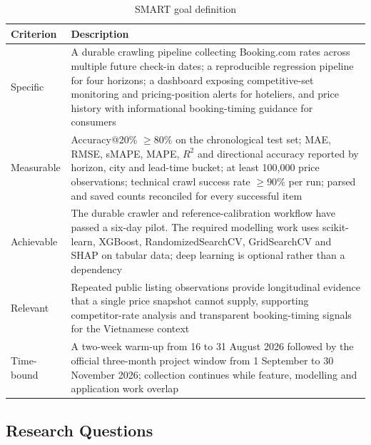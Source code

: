 \begin{table}[!htbp]
\centering
\caption{SMART goal definition}
\label{tab:smart}
\begin{tabular}{|p{2.3cm}|p{11.2cm}|}
\hline
\textbf{Criterion} & \textbf{Description} \\
\hline
Specific & A durable crawling pipeline collecting Booking.com rates across multiple future check-in dates; a reproducible regression pipeline for four horizons; a dashboard exposing competitive-set monitoring and pricing-position alerts for hoteliers, and price history with informational booking-timing guidance for consumers \\
\hline
Measurable & Accuracy@20\% $\geq 80\%$ on the chronological test set; MAE, RMSE, sMAPE, MAPE, $R^2$ and directional accuracy reported by horizon, city and lead-time bucket; at least 100,000 price observations; technical crawl success rate $\geq 90\%$ per run; parsed and saved counts reconciled for every successful item \\
\hline
Achievable & The durable crawler and reference-calibration workflow have passed a six-day pilot. The required modelling work uses scikit-learn, XGBoost, RandomizedSearchCV, GridSearchCV and SHAP on tabular data; deep learning is optional rather than a dependency \\
\hline
Relevant & Repeated public listing observations provide longitudinal evidence that a single price snapshot cannot supply, supporting competitor-rate analysis and transparent booking-timing signals for the Vietnamese context \\
\hline
Time-bound & A two-week warm-up from 16 to 31 August 2026 followed by the official three-month project window from 1 September to 30 November 2026; collection continues while feature, modelling and application work overlap \\
\hline
\end{tabular}
\end{table}

\subsection{Research Questions}

